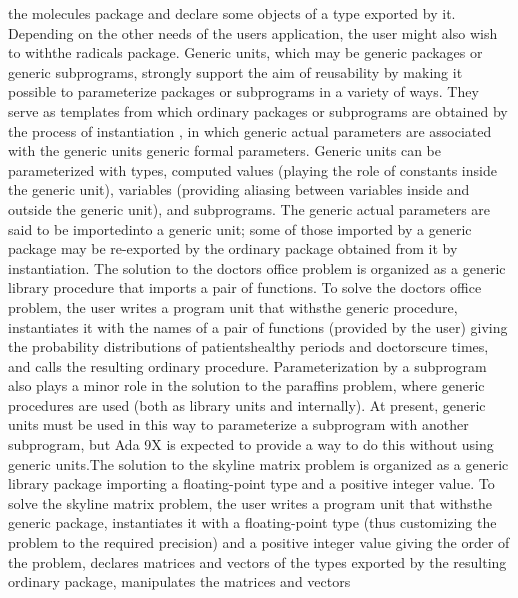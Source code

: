 the molecules package and declare some objects of a type exported
by it. Depending on the other needs of the user\rsquo[]s application,
the user might also wish to \ldquo[]with\rdquo[] the radicals package.%
\Endpara[]
\Para[]\txtxemph[]Generic units\txtxendemph[], which may be generic
packages or generic subprograms, strongly support the aim of reusability
by making it possible to parameterize packages or subprograms in a
variety of ways. They serve as templates from which ordinary packages
or subprograms are obtained by the process of \txtxemph[]instantiation%
\txtxendemph[], in which \txtxemph[]generic actual parameters%
\txtxendemph[] are associated with the generic unit\rsquo[]s %
\txtxemph[]generic formal parameters\txtxendemph[]. Generic units
can be parameterized with types, computed values (playing the role
of constants inside the generic unit), variables (providing aliasing
between variables inside and outside the generic unit), and subprograms.
The generic actual parameters are said to be \ldquo[]imported\rdquo[]
into a generic unit; some of those imported by a generic package may
be re-exported by the ordinary package obtained from it by instantiation.%
\Endpara[]
\Para[]The solution to the doctor\rsquo[]s office problem is organized
as a generic library procedure that imports a pair of functions. To
solve the doctor\rsquo[]s office problem, the user writes a program
unit that \ldquo[]withs\rdquo[] the generic procedure, instantiates
it with the names of a pair of functions (provided by the user) giving
the probability distributions of patients\rsquo[] healthy periods
and doctors\rsquo[] cure times, and calls the resulting ordinary procedure.
Parameterization by a subprogram also plays a minor role in the solution
to the paraffins problem, where generic procedures are used (both
as library units and internally). At present, generic units must be
used in this way to parameterize a subprogram with another subprogram,
but Ada 9X is expected to provide a way to do this without using generic
units.\Endpara[]
\Para[]The solution to the skyline matrix problem is organized as
a generic library package importing a floating-point type and a positive
integer value. To solve the skyline matrix problem, the user writes
a program unit that \ldquo[]withs\rdquo[] the generic package, instantiates
it with a floating-point type (thus customizing the problem to the
required precision) and a positive integer value giving the order
of the problem, declares matrices and vectors of the types exported
by the resulting ordinary package, manipulates the matrices and vectors
